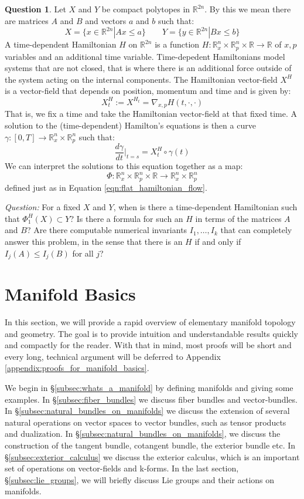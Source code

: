 \documentclass[12pt]{article}
\theoremstyle{definition}
\newtheorem{question}[theorem]{Question}
\numberwithin{equation}{section}
\newcommand{\R}{{\mathbb R}}
\begin{document}
\begin{question} Let $X$ and $Y$ be compact polytopes in $\R^{2n}$. By this we mean there are matrices $A$ and $B$ and vectors $a$ and $b$ such that:
\[
X = \{x \in \R^{2n}|Ax \le a\} \qquad Y = \{y \in \R^{2n}|Bx \le b\}
\]
A time-dependent Hamiltonian $H$ on $\R^{2n}$ is a function $H:\R^n_x \times \R^n_p \times \R \to \R$ of $x,p$ variables and an additional time variable. Time-depedent Hamiltonians model systems that are not closed, that is where there is an additional force outside of the system acting on the internal components. The Hamiltonian vector-field $X^H$ is a vector-field that depends on position, momentum and time and is given by:
\[
X^H_t := X^{H_t} = \nabla_{x,p}H(t,\cdot,\cdot)
\]
That is, we fix a time and take the Hamiltonian vector-field at that fixed time. A solution to the (time-dependent) Hamilton's equations is then a curve $\gamma:[0,T] \to \R^n_x \times \R^n_p$ such that:
\[
\frac{d\gamma}{dt}|_{t = s} = X^H_t \circ \gamma(t)
\]
We can interpret the solutions to this equation together as a map:
\[
\Phi:\R^n_x \times \R^n_p \times \R \to \R^n_x \times \R^n_p
\]
defined just as in Equation \ref{eqn:flat_hamiltonian_flow}.

\emph{Question:} For a fixed $X$ and $Y$, when is there a time-dependent Hamiltonian such that $\Phi^H_1(X) \subset Y$? Is there a formula for such an $H$ in terms of the matrices $A$ and $B$? Are there computable numerical invariants $I_1,\dots,I_k$ that can completely answer this problem, in the sense that there is an $H$ if and only if $I_j(A) \le I_j(B)$ for all $j$?
\end{question}

\section{Manifold Basics} \label{sec:manifold_basics} In this section, we will provide a rapid overview of elementary manifold topology and geometry. The goal is to provide intuition and understandable results quickly and compactly for the reader. With that in mind, most proofs will be short and every long, technical argument will be deferred to Appendix \ref{appendix:proofs_for_manifold_basics}.

We begin in \S \ref{subsec:whats_a_manifold} by defining manifolds and giving some examples. In \S \ref{subsec:fiber_bundles} we discuss fiber bundles and vector-bundles. In \S \ref{subsec:natural_bundles_on_manifolds} we discuss the extension of several natural operations on vector spaces to vector bundles, such as tensor products and dualization. In \S \ref{subsec:natural_bundles_on_manifolds}, we discuss the construction of the tangent bundle, cotangent bundle, the exterior bundle etc. In \S \ref{subsec:exterior_calculus} we discuss the exterior calculus, which is an important set of operations on vector-fields and k-forms. In the last section, \S \ref{subsec:lie_groups}, we will briefly discuss Lie groups and their actions on manifolds.
\end{document}
